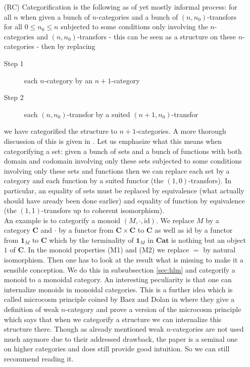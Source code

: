 \begin{enumerate}
\item[(RC)]
Categorification is the following as of yet mostly informal process: for all $n$ when given a bunch of $n$-categories and a bunch of $(n,n_{0})$-transfors for all $0 \leq n_{0} \leq n$ subjected to some conditions only involving the $n$-categories and $(n,n_{0})$-transfors - this can be seen as a structure on these $n$-categories - then by replacing
\begin{description}
\item[Step 1]
each $n$-category by an $n+1$-category
\item[Step 2]
each $(n,n_{0})$-transfor by a suited $(n+1,n_{0})$-transfor
\end{description}
we have categorified the structure to $n+1$-categories. A more thorough discussion of this is given in \cite{66edf75b}. Let us emphasize what this means when categorifying a set: given a bunch of sets and a bunch of functions with both domain and codomain involving only these sets subjected to some conditions involving only these sets and functions then we can replace each set by a category and each function by a suited functor (the $(1,0)$-transfors). In particular, an equality of sets must be replaced by equivalence (what actually should have aready been done earlier) and equality of function by equivalence (the $(1,1)$-transfors up to coherent isomorphism).
\\
An example is to categorify a monoid $(M,\cdot,\mathrm{id})$. We replace $M$ by a category $\mathbf{C}$ and $\cdot$ by a functor from $\mathbf{C} \times \mathbf{C}$ to $\mathbf{C}$ as well as $\mathrm{id}$ by a functor from $\mathbf{1}_{M}$ to $\mathbf{C}$ which by the terminality of $\mathbf{1}_{M}$ in $\mathbf{Cat}$ is nothing but an object $1$ of $\mathbf{C}$. In the monoid properties (M1) and (M2) we replace $=$ by natural isomorphism. Then one has to look at the result what is missing to make it a sensible conception. We do this in subsubsection \ref{sec:hlm} and categorify a monoid to a monoidal category. An interesting peculiarity is that one can internalize monoids in monoidal categories. This is a further idea which is called microcosm principle coined by Baez and Dolan in \cite{0d7b89ad} where they give a definition of weak $n$-category and prove a version of the microcosm principle which says that when we categorify a structure we can internalize this structure there. Though as already mentioned weak $n$-categories are not used much anymore due to their addressed drawback, the paper \cite{0d7b89ad} is a seminal one on higher categories and does still provide good intuition. So we can still recommend reading it.

\end{enumerate}
